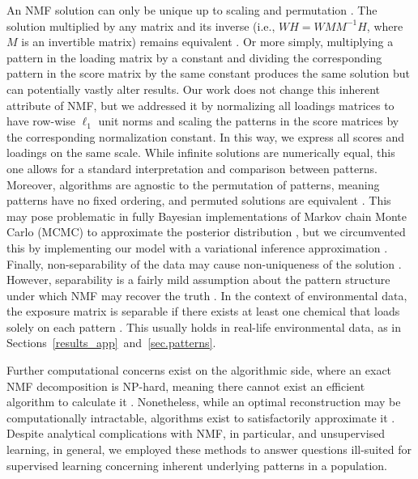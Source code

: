 An NMF solution can only be unique up to scaling and permutation \citep{eggert2004sparse}. The solution multiplied by any matrix and its inverse (i.e., $W H = W M M^{-1} H$, where $M$ is an invertible matrix) remains equivalent \citep{xu2003document}. Or more simply, multiplying a pattern in the loading matrix by a constant and dividing the corresponding pattern in the score matrix by the same constant produces the same solution but can potentially vastly alter results. Our work does not change this inherent attribute of NMF, but we addressed it by normalizing all loadings matrices to have row-wise $\ell_1$ unit norms and scaling the patterns in the score matrices by the corresponding normalization constant. In this way, we express all scores and loadings on the same scale. While infinite solutions are numerically equal, this one allows for a standard interpretation and comparison between patterns. Moreover, algorithms are agnostic to the permutation of patterns, meaning patterns have no fixed ordering, and permuted solutions are equivalent \citep{celeux1998bayesian}. This may pose problematic in fully Bayesian implementations of Markov chain Monte Carlo (MCMC) to approximate the posterior distribution \citep{bda3}, but we circumvented this by implementing our model with a variational inference approximation \citep{blei2017variational}. Finally, non-separability of the data may cause non-uniqueness of the solution \citep{laurberg2008theorems}. However, separability is a fairly mild assumption about the pattern structure under which NMF may recover the truth \citep{arora2016computing}. In the context of environmental data, the exposure matrix is separable if there exists at least one chemical that loads solely on each pattern \citep{arora2012learning}. This usually holds in real-life environmental data, as in Sections~\ref{results_app}~and~\ref{sec.patterns}.

Further computational concerns exist on the algorithmic side, where an exact NMF decomposition is NP-hard, meaning there cannot exist an efficient algorithm to calculate it \citep{vavasis2010complexity}. Nonetheless, while an optimal reconstruction may be computationally intractable, algorithms exist to satisfactorily approximate it \citep{gillis2020nonnegative}. Despite analytical complications with NMF, in particular, and unsupervised learning, in general, we employed these methods to answer questions ill-suited for supervised learning concerning inherent underlying patterns in a population.

